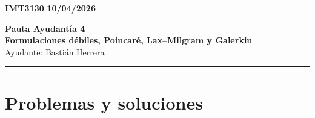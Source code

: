 \documentclass[11pt]{article}
\begin{document}
    \begin{flushleft}
        \small
        \vspace{1pt}
        \textbf{IMT3130} \hfill
        \textbf{10/04/2026}
    \end{flushleft}
    \begin{center}
        \LARGE\textbf{Pauta Ayudantía 4}\\
        \vspace{3pt}
        \normalsize\textbf{Formulaciones débiles, Poincaré, Lax--Milgram y Galerkin}\\
        \normalsize Ayudante: Bastián Herrera 
        \rule{\textwidth}{0.05mm}
    \end{center}

\section*{Problemas y soluciones}
\end{document}
